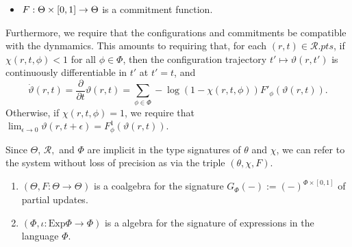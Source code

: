 \documentclass{article}
\newcommand\pts[1]{#1.\mathit{pts}}
\newcommand\R{\mathcal R}
\begin{document}
\begin{defn}
\begin{itemize}[]
        \item $F : \Theta \time \Phi \times [0,1] \to \Theta$ is a commitment function.
    \end{itemize}
    Furthermore, we require that the configurations and commitments be compatible with the dynmamics.
    This amounts to requiring that,
    for each $(r,t) \in \pts \R$, 
        if $\chi(r,t,\phi) < 1$ for all $\phi \in \Phi$, then
    the configuration trajectory $t' \mapsto \vartheta(r,t')$ is continuously differentiable in $t'$ at $t'=t$, and
    \[
        \dot\vartheta(r,t) = \frac{\partial}{\partial t} \vartheta(r, t) = 
            \sum_{\phi \in \Phi} -\log (1 - \chi(r,t,\phi)) F'_\phi(\vartheta(r,t)).
    \]
    Otherwise, if $\chi(r,t,\phi) = 1$, we require that
    $\displaystyle
        \lim_{\epsilon \to 0} \vartheta(r,t+\epsilon) = 
            F^1_\phi(\vartheta(r,t))
    $.
    
    Since $\Theta$, $\R,$ and $\Phi$ are implicit in the type signatures of $\theta$ and $\chi$, we can refer to the system without loss of precision as via the triple $(\theta, \chi, F)$. 
\end{defn}

\begin{remark}
    \begin{enumerate}
        \item 
        $(\Theta, F: \Theta \to \Theta^{})$ is a coalgebra for the signature $G_\Phi(-) := (-)^{\Phi \times [0,1]}$ of partial updates.
        \item $(\Phi, \iota : \mathrm{Exp} \Phi \to \Phi)$ is a algebra for the signature of expressions in the language $\Phi$. 
    \end{enumerate}
\end{remark}
\end{document}
